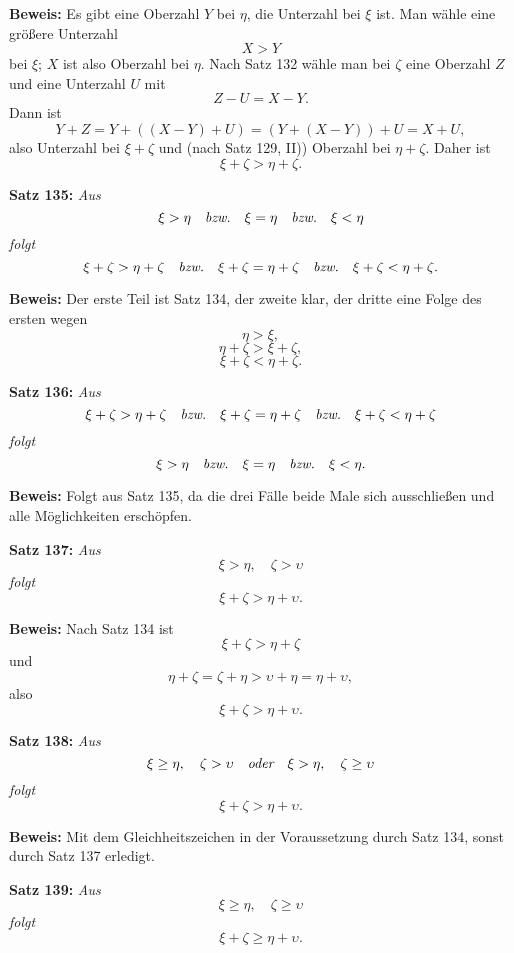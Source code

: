 {\bf Beweis:} Es gibt eine Oberzahl $Y$ bei $\eta$, die Unterzahl bei $\xi$
ist.  Man w\"ahle eine gr\"o{\ss}ere Unterzahl
$$X > Y$$
bei $\xi$; $X$ ist also Oberzahl bei $\eta$.  Nach Satz 132 w\"ahle man bei
$\zeta$ eine Oberzahl $Z$ und eine Unterzahl $U$ mit
$$Z - U = X - Y.$$
Dann ist
$$Y + Z = Y + ((X - Y) + U) = (Y + (X - Y)) + U = X + U,$$
also Unterzahl bei $\xi + \zeta$ und (nach Satz 129, II)) Oberzahl bei $\eta + \zeta$.
Daher ist
$$\xi + \zeta > \eta + \zeta.$$
\medskip


{\bf Satz 135:} {\it Aus
$$\xi > \eta\quad\hbox{\it bzw.}\quad \xi = \eta\quad\hbox{\it bzw.}\quad \xi < \eta$$
folgt
$$\xi + \zeta > \eta + \zeta\quad\hbox{\it bzw.}\quad \xi + \zeta = \eta + \zeta\quad\hbox{\it bzw.}\quad \xi + \zeta < \eta + \zeta.$$}%

{\bf Beweis:} Der erste Teil ist Satz 134, der zweite klar, der
dritte eine Folge des ersten wegen
$$\eta > \xi,$$
$$\eta + \zeta > \xi + \zeta,$$
$$\xi + \zeta < \eta + \zeta.$$
\medskip


{\bf Satz 136:} {\it Aus
$$\xi + \zeta > \eta + \zeta\quad\hbox{\it bzw.}\quad \xi + \zeta = \eta + \zeta\quad\hbox{\it bzw.}\quad \xi + \zeta < \eta + \zeta$$
folgt
$$\xi > \eta\quad\hbox{\it bzw.}\quad \xi = \eta\quad\hbox{\it bzw.}\quad \xi < \eta.$$}%

{\bf Beweis:} Folgt aus Satz 135, da die drei F\"alle beide Male
sich ausschlie{\ss}en und alle M\"oglichkeiten ersch\"opfen.
\medskip


{\bf Satz 137:} {\it Aus
$$\xi > \eta,\quad \zeta > \upsilon$$
folgt
$$\xi + \zeta > \eta + \upsilon.$$}%

{\bf Beweis:} Nach Satz 134 ist
$$\xi + \zeta > \eta + \zeta$$
und
$$\eta + \zeta = \zeta + \eta > \upsilon + \eta = \eta + \upsilon,$$
also
$$\xi + \zeta > \eta + \upsilon.$$
\medskip


{\bf Satz 138:} {\it Aus
$$\xi \ge \eta,\quad \zeta > \upsilon\quad\hbox{\it oder}\quad \xi > \eta,\quad \zeta \ge \upsilon$$
folgt
$$\xi + \zeta > \eta + \upsilon.$$}%

{\bf Beweis:} Mit dem Gleichheitszeichen in der Voraussetzung
durch Satz 134, sonst durch Satz 137 erledigt.
\medskip


{\bf Satz 139:} {\it Aus
$$\xi \ge \eta,\quad \zeta \ge \upsilon$$
folgt
$$\xi + \zeta \ge \eta + \upsilon.$$}%

